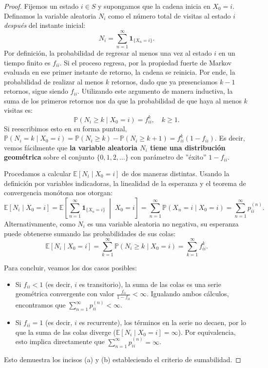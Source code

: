\documentclass[12pt]{book}
\begin{document}
\begin{proof}
Fijemos un estado $i \in S$ y supongamos que la cadena inicia en $X_0 = i$. Definamos la variable aleatoria $N_i$ como el número total de visitas al estado $i$ \emph{después} del instante inicial:
\[
N_i = \sum_{n=1}^{\infty} \mathbf{1}_{\{X_n = i\}}.
\]
Por definición, la probabilidad de regresar al menos una vez al estado $i$ en un tiempo finito es $f_{ii}$. Si el proceso regresa, por la propiedad fuerte de Markov evaluada en ese primer instante de retorno, la cadena se reinicia. Por ende, la probabilidad de realizar al menos $k$ retornos, dado que ya presenciamos $k-1$ retornos, sigue siendo $f_{ii}$. Utilizando este argumento de manera inductiva, la suma de los primeros retornos nos da que la probabilidad de que haya al menos $k$ visitas es:
\[
\mathbb{P}(N_i \geq k \mid X_0 = i) = f_{ii}^k, \quad k \geq 1.
\]
Si reescribimos esto en su forma puntual, $\mathbb{P}(N_i = k \mid X_0 = i) = \mathbb{P}(N_i \geq k) - \mathbb{P}(N_i \geq k+1) = f_{ii}^k (1 - f_{ii})$. Es decir, vemos fácilmente que \textbf{la variable aleatoria $N_i$ tiene una distribución geométrica} sobre el conjunto $\{0, 1, 2, \dots\}$ con parámetro de ''éxito'' $1 - f_{ii}$.

Procedamos a calcular $\mathbb{E}[N_i \mid X_0 = i]$ de dos maneras distintas. Usando la definición por variables indicadoras, la linealidad de la esperanza y el teorema de convergencia monótona nos otorgan:
\[
\mathbb{E}[N_i \mid X_0 = i] = \mathbb{E}\left[ \sum_{n=1}^{\infty} \mathbf{1}_{\{X_n = i\}} \;\middle|\; X_0 = i \right] = \sum_{n=1}^{\infty} \mathbb{P}(X_n = i \mid X_0 = i) = \sum_{n=1}^{\infty} p_{ii}^{(n)}.
\]
Alternativamente, como $N_i$ es una variable aleatoria no negativa, su esperanza puede obtenerse sumando las probabilidades de sus colas:
\[
\mathbb{E}[N_i \mid X_0 = i] = \sum_{k=1}^{\infty} \mathbb{P}(N_i \geq k \mid X_0 = i) = \sum_{k=1}^{\infty} f_{ii}^k.
\]

Para concluir, veamos los dos casos posibles:
\begin{itemize}
    \item Si $f_{ii} < 1$ (es decir, $i$ es transitorio), la suma de las colas es una serie geométrica convergente con valor $\frac{f_{ii}}{1 - f_{ii}} < \infty$. Igualando ambos cálculos, encontramos que $\sum_{n=1}^{\infty} p_{ii}^{(n)} < \infty$.
    \item Si $f_{ii} = 1$ (es decir, $i$ es recurrente), los términos en la serie no decaen, por lo que la suma de las colas diverge ($\mathbb{E}[N_i \mid X_0 = i] = \infty$). Por equivalencia, esto implica directamente que $\sum_{n=1}^{\infty} p_{ii}^{(n)} = \infty$.
\end{itemize}
Esto demuestra los incisos (a) y (b) estableciendo el criterio de sumabilidad.
\end{proof}
\end{document}
